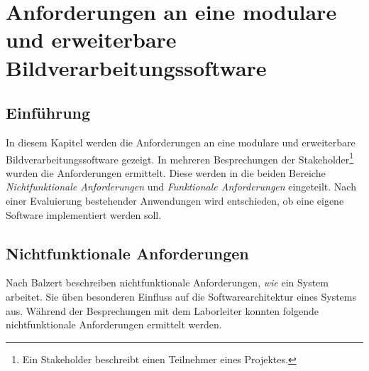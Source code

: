 \chapter{Anforderungen an eine modulare und erweiterbare Bildverarbeitungssoftware}\label{anforderungen}


\FloatBarrier
\section{Einführung}

In diesem Kapitel werden die Anforderungen an eine modulare und erweiterbare Bildverarbeitungssoftware gezeigt. In mehreren Besprechungen der Stakeholder\footnote{Ein Stakeholder beschreibt einen Teilnehmer eines Projektes.} wurden die Anforderungen ermittelt. Diese werden in die beiden Bereiche \textit{Nichtfunktionale Anforderungen} und \textit{Funktionale Anforderungen} eingeteilt. Nach einer Evaluierung bestehender Anwendungen wird entschieden, ob eine eigene Software implementiert werden soll.


\FloatBarrier
\section{Nichtfunktionale Anforderungen}

Nach Balzert \cite[9]{balzert:swa} beschreiben nichtfunktionale Anforderungen, \textit{wie} ein System arbeitet. Sie üben besonderen Einfluss auf die Softwarearchitektur eines Systems aus.
Während der Besprechungen mit dem Laborleiter konnten folgende nichtfunktionale Anforderungen ermittelt werden.

